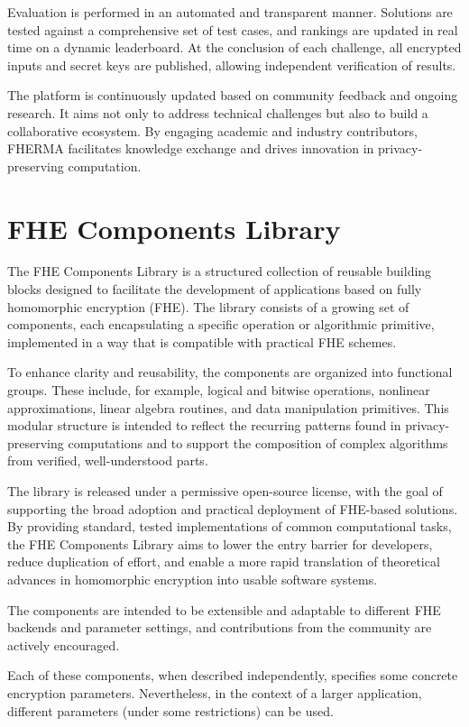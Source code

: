 \documentclass[article]{iacrtrans}
\newcommand{\andreea}[1]{{\color{blue} [Andreea: #1]}}
\newcommand{\daria}[1]{{\color{violet} [Daria: #1]}}
\begin{document}
Evaluation is performed in an automated and transparent manner. Solutions are tested against a comprehensive set of test cases, and rankings are updated in real time on a dynamic leaderboard. At the conclusion of each challenge, all encrypted inputs and secret keys are published, allowing independent verification of results.

The platform is continuously updated based on community feedback and ongoing research. It aims not only to address technical challenges but also to build a collaborative ecosystem. By engaging academic and industry contributors, FHERMA facilitates knowledge exchange and drives innovation in privacy-preserving computation.


\section{FHE Components Library }
The FHE Components Library is a structured collection of reusable building blocks designed to facilitate the development of applications based on fully homomorphic encryption (FHE). The library consists of a growing set of components, each encapsulating a specific operation or algorithmic primitive, implemented in a way that is compatible with practical FHE schemes.

To enhance clarity and reusability, the components are organized into functional groups. These include, for example, logical and bitwise operations, nonlinear approximations, linear algebra routines, and data manipulation primitives. This modular structure is intended to reflect the recurring patterns found in privacy-preserving computations and to support the composition of complex algorithms from verified, well-understood parts.

The library is released under a permissive open-source license, with the goal of supporting the broad adoption and practical deployment of FHE-based solutions. By providing standard, tested implementations of common computational tasks, the FHE Components Library aims to lower the entry barrier for developers, reduce duplication of effort, and enable a more rapid translation of theoretical advances in homomorphic encryption into usable software systems.

The components are intended to be extensible and adaptable to different FHE backends and parameter settings, and contributions from the community are actively encouraged.

Each of these components, when described independently, specifies some concrete encryption parameters. Nevertheless, in the context of a larger application, different parameters (under some restrictions) can be used.
\end{document}
